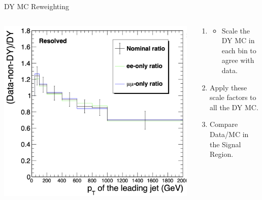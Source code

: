 \documentclass[aspectratio=169]{beamer}
\begin{document}
\begin{frame}{DY MC Reweighting}
  \begin{columns}
    \begin{column}{0.50\textwidth}
      \centering
      \includegraphics[width=\textwidth]{../figures/plots/lead-jet-pt-reweighting.png}
    \end{column}
    \begin{column}{0.50\textwidth}
        \centering
        \resizebox{0.55\columnwidth}{!}{%
        
        }
        \vfill
      \begin{block}{}
        \begin{enumerate}
          \item {}
          \begin{itemize}
            \item Scale the DY MC in each bin to agree with data. 
          \end{itemize}
          \item Apply these scale factors to all the DY MC.
          \item Compare Data/MC in the Signal Region.
        \end{enumerate}
        
      \end{block}
    \end{column}
  \end{columns}
\end{frame}
\end{document}
